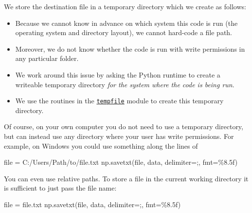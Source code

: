 \documentclass{scrartcl}
\providecommand{\tightlist}{%
      \setlength{\itemsep}{0pt}\setlength{\parskip}{0pt}}
\newenvironment{Shaded}{}{}
\newcommand{\StringTok}[1]{\textcolor[rgb]{0.25,0.44,0.63}{{#1}}}
\newcommand{\NormalTok}[1]{{#1}}
\newcommand{\SpecialCharTok}[1]{\textcolor[rgb]{0.25,0.44,0.63}{{#1}}}
\newcommand{\OperatorTok}[1]{\textcolor[rgb]{0.40,0.40,0.40}{{#1}}}
\newcommand{\BuiltInTok}[1]{{#1}}
\begin{document}
We store the destination file in a temporary directory which we create
as follows:

\begin{itemize}
\tightlist
\item
  Because we cannot know in advance on which system this code is run
  (\eg the operating system and directory layout), we cannot hard-code
  a file path.
\item
  Moreover, we do not know whether the code is run with write
  permissions in any particular folder.
\item
  We work around this issue by asking the Python runtime to create a
  writeable temporary directory \emph{for the system where the code is
  being run}.
\item
  We use the routines in the
  \href{https://docs.python.org/3/library/tempfile.html}{\texttt{tempfile}}
  module to create this temporary directory.
\end{itemize}

Of course, on your own computer you do not need to use a temporary
directory, but can instead use any directory where your user has write
permissions. For example, on Windows you could use something along the
lines of

\begin{Shaded}
\begin{Highlighting}[]
\BuiltInTok{file} \OperatorTok{=} \StringTok{\textquotesingle{}C:/Users/Path/to/file.txt\textquotesingle{}}
\NormalTok{np.savetxt(}\BuiltInTok{file}\NormalTok{, data, delimiter}\OperatorTok{=}\StringTok{\textquotesingle{};\textquotesingle{}}\NormalTok{, fmt}\OperatorTok{=}\StringTok{\textquotesingle{}}\SpecialCharTok{\%8.5f}\StringTok{\textquotesingle{}}\NormalTok{)}
\end{Highlighting}
\end{Shaded}

You can even use relative paths. To store a file in the current working
directory it is sufficient to just pass the file name:

\begin{Shaded}
\begin{Highlighting}[]
\BuiltInTok{file} \OperatorTok{=} \StringTok{\textquotesingle{}file.txt\textquotesingle{}}
\NormalTok{np.savetxt(}\BuiltInTok{file}\NormalTok{, data, delimiter}\OperatorTok{=}\StringTok{\textquotesingle{};\textquotesingle{}}\NormalTok{, fmt}\OperatorTok{=}\StringTok{\textquotesingle{}}\SpecialCharTok{\%8.5f}\StringTok{\textquotesingle{}}\NormalTok{)}
\end{Highlighting}
\end{Shaded}
\end{document}
